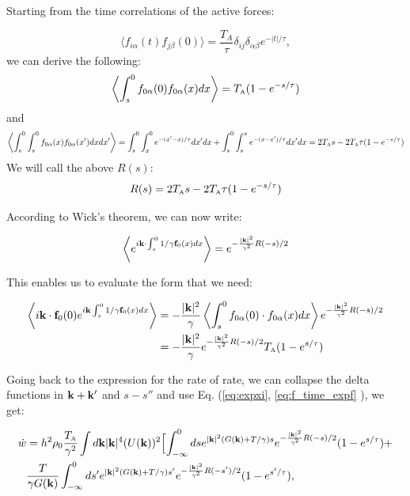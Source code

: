 \documentclass[superscriptaddress, amsmath,preprintnumbers,10pt,article,notitlepage]{revtex4-1}
\newcommand{\A}{\text{\tiny{A}}}
\begin{document}
Starting from the time correlations of the active forces:

\begin{equation*}\label{eq:active_corr}
\langle f_{i\alpha}(t) f_{j\beta}(0) \rangle = \frac{T_{A}}{\tau} \delta_{ij} \delta_{\alpha\beta} e^{-|t|/\tau},
\end{equation*}
we can derive the following:
\begin{equation*}
\left \langle \int_{s}^0 f_{0\alpha}(0) f_{0\alpha} (x) dx \right \rangle = T_\A (1 - e^{-s/\tau})
\end{equation*}
and
\begin{equation*}
 \left \langle \int_{s}^0 \int_{s}^0  f_{0\alpha} (x)  f_{0\alpha} (x')  dx dx' \right \rangle  =  \int_{s}^0 \int_{x}^0 e^{-(x'-x)/\tau} dx' dx +  \int_{s}^0 \int_{s}^x e^{-(x-x')/\tau} dx' dx = 2T_\A s - 2 T_\A \tau (1 - e^{-s/\tau}) 
\end{equation*}
We will call the above $R(s)$:
\begin{equation*}
R(s) = 2T_\A s - 2 T_\A \tau (1 - e^{-s/\tau}) 
\end{equation*}

According to Wick's theorem, we can now write:

\begin{equation}\label{eq:expf}
\left \langle e^{i{\bf k}\cdot \int_{s}^0 1/\gamma{\bf f}_0(x) dx} \right\rangle =e^{-\frac{|{\bf k}|^2}{\gamma^2} R(-s)/2} 
\end{equation}

This enables us to evaluate the form that we need:

\begin{align}\label{eq:f_time_expf}
\left \langle i{\bf k} \cdot {\bf f}_0(0) e^{i{\bf k} \int_s^0 1/\gamma {\bf f}_0(x) dx} \right \rangle &  = -\dfrac{|{\bf k}|^2}{\gamma} \left \langle  \int_s^0 f_{0\alpha}(0) \cdot f_{0\alpha}(x) dx \right \rangle e^{-\frac{|{\bf k}|^2}{\gamma^2}R(-s)/2} \nonumber \\
& = -\dfrac{|{\bf k}|^2}{\gamma} e^{-\frac{|{\bf k}|^2}{\gamma^2}R(-s)/2} T_\A (1-e^{s/\tau}) 
\end{align}


Going back to the expression for the rate of rate, we can collapse the delta functions in ${\bf k} + {\bf k}'$ and $s-s''$ and use Eq. (\ref{eq:expxi}, \ref{eq:f_time_expf} ),  we get:

\begin{align*}
\dot{w} & = h^2 \rho_0 \dfrac{T_\A}{\gamma^2} \int d{\bf k} |{\bf k}|^4 (U({\bf k}))^2  \Bigl[ \int
_{-\infty}^0 ds e^{|{\bf k}|^2 ( G({\bf k}) + T/ \gamma)s}  e^{-\frac{|{\bf k}|^2}{\gamma^2} R(-s)/2} (1-e^{s/\tau})  + \\
&  \dfrac{T}{\gamma G({\bf k})} \int_{-\infty}^0 ds'  e^{|{\bf k}|^2 ( G({\bf k}) + T/ \gamma)s'}  e^{-\frac{|{\bf k}|^2}{\gamma^2} R(-s')/2} (1-e^{s'/\tau}),
\end{align*}
\end{document}
